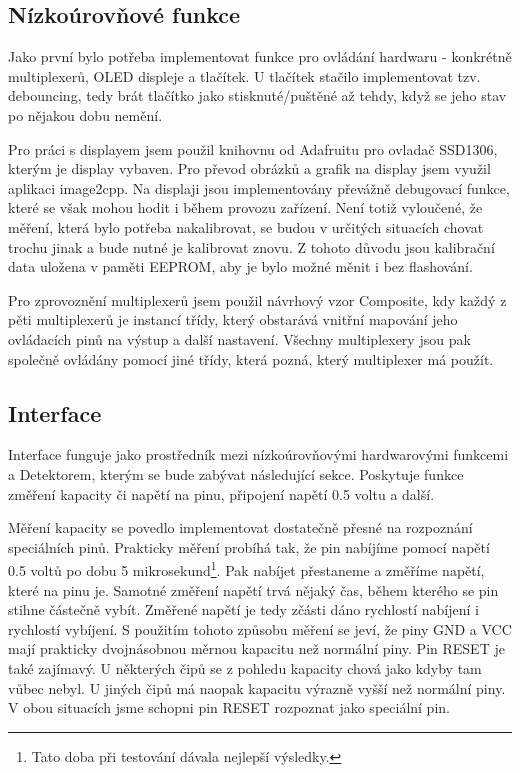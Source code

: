 \documentclass[11pt,a4paper,twoside,openright]{report}
\begin{document}
\subsection {Nízkoúrovňové funkce}

Jako první bylo potřeba implementovat funkce pro ovládání hardwaru - konkrétně multiplexerů, OLED displeje a tlačítek. U tlačítek stačilo implementovat tzv. debouncing, tedy brát tlačítko jako stisknuté/puštěné až tehdy, když se jeho stav po nějakou dobu nemění.

Pro práci s displayem jsem použil knihovnu od Adafruitu pro ovladač SSD1306, kterým je display vybaven. Pro převod obrázků a grafik na display jsem využil aplikaci image2cpp.\cite{image2cpp} Na displaji jsou implementovány převážně debugovací funkce, které se však mohou hodit i během provozu zařízení. Není totiž vyloučené, že měření, která bylo potřeba nakalibrovat, se budou v určitých situacích chovat trochu jinak a bude nutné je kalibrovat znovu. Z tohoto důvodu jsou kalibrační data uložena v paměti EEPROM, aby je bylo možné měnit i bez flashování.

Pro zprovoznění multiplexerů jsem použil návrhový vzor Composite, kdy každý z pěti multiplexerů je instancí třídy, který obstarává vnitřní mapování  jeho ovládacích pinů na výstup a další nastavení. Všechny multiplexery jsou pak společně ovládány pomocí jiné třídy, která pozná, který multiplexer má použít.

\subsection {Interface \label{software:capacitance}}

Interface funguje jako prostředník mezi nízkoúrovňovými hardwarovými funkcemi a Detektorem, kterým se bude zabývat následující sekce. Poskytuje funkce změření kapacity či napětí na pinu, připojení napětí 0.5 voltu a další.

Měření kapacity se povedlo implementovat dostatečně přesné na rozpoznání speciálních pinů. Prakticky měření probíhá tak, že pin nabíjíme pomocí napětí 0.5 voltů po dobu 5 mikrosekund\footnote{Tato doba při testování dávala nejlepší výsledky.}. Pak nabíjet přestaneme a změříme napětí, které na pinu je. Samotné změření napětí trvá nějaký čas, během kterého se pin stihne částečně vybít. Změřené napětí je tedy zčásti dáno rychlostí nabíjení i rychlostí vybíjení. S použitím tohoto způsobu měření se jeví, že piny GND a VCC mají prakticky dvojnásobnou měrnou kapacitu než normální piny. Pin RESET je také zajímavý. U některých čipů se z pohledu kapacity chová jako kdyby tam vůbec nebyl. U jiných čipů má naopak kapacitu výrazně vyšší než normální piny. V obou situacích jsme schopni pin RESET rozpoznat jako speciální pin.
\end{document}

